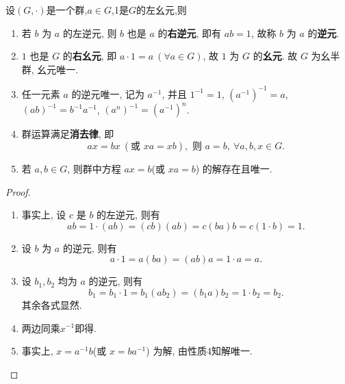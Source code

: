 \documentclass[../../main.tex]{subfiles}
\begin{document}
\begin{theorem}[群的基本性质]
设$(G,\cdot)$是一个群,$a\in G$,1是$G$的左幺元,则
\begin{enumerate}
\item 若 \( b \) 为 \( a \) 的左逆元, 则 \( b \) 也是 \( a \) 的\textbf{右逆元}, 即有 \( ab = 1 \), 故称 \( b \) 为 \( a \) 的\textbf{逆元}.

\item \( 1 \) 也是 \( G \) 的\textbf{右幺元}, 即 \( a \cdot 1 = a \ (\forall a \in G) \), 故 \( 1 \) 为 \( G \) 的\textbf{幺元}. 故 \( G \) 为幺半群, 幺元唯一.

\item 任一元素 \( a \) 的逆元唯一, 记为 \( a^{-1} \), 并且 \( 1^{-1} = 1 \), \( (a^{-1})^{-1} = a \), \( (ab)^{-1} = b^{-1}a^{-1} \), \( (a^n)^{-1} = (a^{-1})^n \).

\item 群运算满足\textbf{消去律}, 即
\[
ax = bx \ (\text{或 } xa = xb), \text{ 则 } a = b, \ \forall a, b, x \in G.
\]

\item 若 \( a, b \in G \), 则群中方程 \( ax = b \)(或 \( xa = b \)) 的解存在且唯一.
\end{enumerate}
\end{theorem}
\begin{proof}
\begin{enumerate}
\item 事实上, 设 \( c \) 是 \( b \) 的左逆元, 则有
\[
ab = 1 \cdot (ab) = (cb)(ab) = c(ba)b = c(1 \cdot b) = 1.
\]

\item 设 \( b \) 为 \( a \) 的逆元, 则有
\[
a \cdot 1 = a(ba) = (ab)a = 1 \cdot a = a.
\]

\item 设 \( b_1, b_2 \) 均为 \( a \) 的逆元, 则有
\[
b_1 = b_1 \cdot 1 = b_1(ab_2) = (b_1a)b_2 = 1 \cdot b_2 = b_2.
\]
其余各式显然.

\item 两边同乘$x^{-1}$即得.

\item 事实上, \( x = a^{-1}b \)(或 \( x = ba^{-1} \)) 为解, 由性质4知解唯一.
\end{enumerate}
\end{proof}
\end{document}

